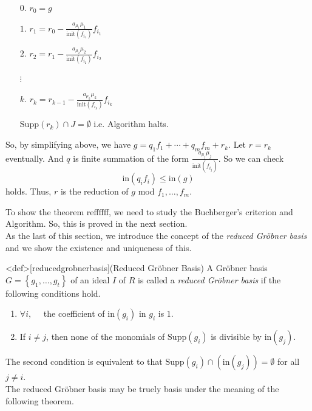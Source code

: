 \documentclass{article}
\begin{document}
\begin{pfsp}
    \begin{enumerate}
        \item[$0$.] $\displaystyle{r_0=g}$
        \item[$1$.] $\displaystyle{r_1 = r_0 - \frac{a_{\mu_1} \mu_1}{\mathrm{init}(f_{i_1})} f_{i_1}}$
        \item[$2$.] $\displaystyle{r_2 = r_1 - \frac{a_{\mu_2} \mu_2}{\mathrm{init}(f_{i_2})} f_{i_2}}$
        \item[] $\vdots$
        \item[$k$.] $\displaystyle{r_k = r_{k-1} - \frac{a_{\mu_k} \mu_k}{\mathrm{init}(f_{i_k})} f_{i_k}}$
        \item[] $\mathrm{Supp}(r_k) \cap J = \emptyset$ i.e. Algorithm halts.
    \end{enumerate}
    So, by simplifying above, we have $g = q_1 f_1 + \cdots + q_m f_m + r_k$. Let $r = r_k$ eventually. And $q$ is finite summation of the form $\displaystyle{\frac{a_{\mu_j} \mu_j}{\mathrm{init}(f_{i_j})}}$. So we can check $$\mathrm{in}(q_i f_i) \leq \mathrm{in}(g)$$ holds. Thus, $r$ is the reduction of $g$ mod $f_1, \ldots, f_m$.
\end{pfsp}

To show the theorem reffffff, we need to study the Buchberger's criterion and Algorithm. So, this is proved in the next section. \\ 
As the last of this section, we introduce the concept of the \textit{reduced Gr\"{o}bner basis} and we show the existence and uniqueness of this. 

\begin{statementsp}<def>[reducedgrobnerbasis](Reduced Gr\"{o}bner Basis)
    A Gr\"{o}bner basis $G = \left\{ g_1, \ldots, g_t \right\}$ of an ideal $I$ of $R$ is called a \textit{reduced Gr\"{o}bner basis} if the following conditions hold.
    \begin{enumerate}
        \item $\forall i, \quad$ the coefficient of $\mathrm{in}(g_i)$ in $g_i$ is $1$. 
        \item If $i \neq j$, then none of the monomials of $\mathrm{Supp}(g_i)$ is divisible by $\mathrm{in}(g_j)$. 
    \end{enumerate}
\end{statementsp}

The second condition is equivalent to that $\mathrm{Supp}(g_i) \cap \left(  \mathrm{in}(g_j) \right) = \emptyset$ for all $j \neq i$.\\ 
The reduced Gr\"{o}bner basis may be truely basis under the meaning of the following theorem. 
\end{document}
